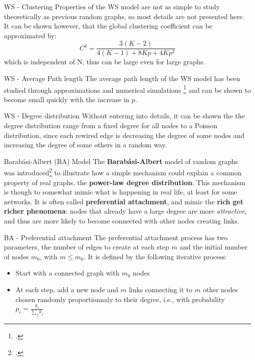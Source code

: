 \begin{textbox}{WS - Clustering}
    Properties of the WS model are not as simple to study theoretically as previous random graphs, so most details are not presented here.
    It can be shown however, that the global clustering coefficient can be approximated by:
    \[
        C^g=\frac{3(K-2)}{4(K-1)+8Kp+4Kp^2}
    \]
    which is independent of N, thus can be large even for large graphs.
\end{textbox}


\begin{textbox}{WS - Average Path length}
    The average path length of the WS model has been studied through approximations and numerical simulations \footcite{newman2000models} and can be shown to become small quickly with the increase in $p$.
\end{textbox}


\begin{textbox}{WS - Degree distribution}
    Without entering into details, it can be shown the the degree distribution range from a fixed degree for all nodes to a Poisson distribution, since each rewired edge is decreasing the degree of some nodes and increasing the degree of some others in a random way.
\end{textbox}


\begin{textbox}{Barabási-Albert (BA) Model}
    The \textbf{Barabási-Albert} model of random graphs was introduced\footcite{barabasi1999emergence} to illustrate how a simple mechanism could explain a common property of real graphs, the \textbf{power-law degree distribution}.
    This mechanism is though to somewhat mimic what is happening in real life, at least for some networks. It is often called \textbf{preferential attachment}, and mimic the \textbf{rich get richer phenomena}: nodes that already have a large degree are more \textit{attractive}, and thus are more likely to become connected with other nodes creating links.
\end{textbox}


\begin{textbox}{BA - Preferential attachment }
    The preferential attachment process has two parameters, the number of edges to create at each step $m$ and the initial number of nodes $m_0$, with $m\leq m_0$. It is defined by the following iterative process:
    \begin{itemize}
        \item Start with a connected graph with $m_0$ nodes
        \item At each step, add a new node and $m$ links connecting it to $m$ other nodes chosen randomly proportionnaly to their degree, i.e., with probability $p_i=\frac{k_i}{\sum_j k_j}$
    \end{itemize}
\end{textbox}


